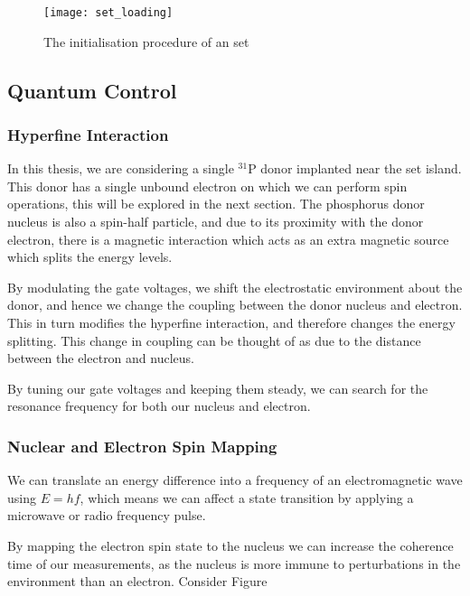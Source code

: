 	\begin{figure}[htbp!]
		\centering
		\texttt{[image: set\_loading]}
		\caption[The initiliasation prodedure]{The initialisation procedure of an \gls{set}\cite{morello2010single}}
		\label{fig::set_loading}
	\end{figure}
	
\subsection{Quantum Control}
	\subsubsection{Hyperfine Interaction}
		In this thesis, we are considering a single $^{31}$P donor implanted near the \gls{set} island. This donor has a single unbound electron on which we can perform spin operations, this will be explored in the next section. The phosphorus donor nucleus is also a spin-half particle, and due to its proximity with the donor electron, there is a magnetic interaction which acts as an extra magnetic source which splits the energy levels.
		
		By modulating the gate voltages, we shift the electrostatic environment about the donor, and hence we change the coupling between the donor nucleus and electron. This in turn modifies the hyperfine interaction, and therefore changes the energy splitting. This change in coupling can be thought of as due to the distance between the electron and nucleus.
		
		By tuning our gate voltages and keeping them steady, we can search for the resonance frequency for both our nucleus and electron. 
	\subsubsection{Nuclear and Electron Spin Mapping}
	\label{sec::nuc_spin_map}
		We can translate an energy difference into a frequency of an electromagnetic wave using $E = h f$, which means we can affect a state transition by applying a microwave or radio frequency pulse.
		
		By mapping the electron spin state to the nucleus we can increase the coherence time of our measurements, as the nucleus is more immune to perturbations in the environment than an electron. Consider Figure 
		
